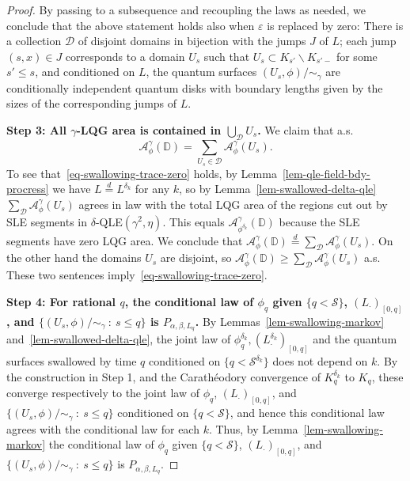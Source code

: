 \documentclass[a4paper]{article}
\numberwithin{equation}{section}
\def\eps{\varepsilon}
\newcommand{\eqb}{\begin{equation}}
\newcommand{\eqe}{\end{equation}}
\newcommand{\D}{\mathbb{D}}
\newcommand{\cA}{\mathcal{A}}
\newcommand{\cD}{\mathcal{D}}
\newcommand{\qduration}{\mathcal{S}}
\theoremstyle{remark}
\numberwithin{equation}{section}
\begin{document}
\begin{proof}
By passing to a subsequence and recoupling the laws as needed, we conclude that the above statement holds also when $\eps$ is replaced by zero: There is a collection $\cD$ of disjoint domains in bijection with the jumps $J$ of $L$; each jump $(s, x) \in J$ corresponds to a domain $U_s$ such that $U_s \subset K_{s'} \backslash K_{s'-}$ for some $s' \leq s$, and conditioned on $L$, the quantum surfaces $(U_s, \phi)/{\sim_\gamma}$ are conditionally independent quantum disks with boundary lengths given by the sizes of the corresponding jumps of $L$.



\medskip \noindent \textbf{Step 3: All $\gamma$-LQG area is contained in $\bigcup_{\cD} U_s$.} We claim that 
a.s.
\eqb\label{eq-swallowing-trace-zero}
\cA^\gamma_\phi(\D) = \sum_{U_s \in \cD} \cA^\gamma_\phi(U_s).
\eqe
To see that~\eqref{eq-swallowing-trace-zero} holds, by Lemma~\ref{lem-qle-field-bdy-procress} we have $L \stackrel d= L^{\delta_k}$ for any $k$, so by Lemma~\ref{lem-swallowed-delta-qle} $\sum_{\mathcal D} \cA^\gamma_\phi(U_s)$ agrees in law with the total LQG area of the regions cut out by SLE segments in $\delta$-QLE$(\gamma^2, \eta)$. This equals $\cA^\gamma_{\phi^{\delta_k}}(\D)$ because the SLE segments have zero LQG area. We conclude that $\cA^\gamma_\phi(\D) \stackrel d= \sum_{\mathcal D} \cA^\gamma_\phi(U_s)$. On the other hand %
the domains $U_s$ are disjoint, so $\cA^\gamma_\phi(\D) \geq \sum_{\mathcal D} \cA^\gamma_\phi(U_s)$ a.s. These two sentences imply~\eqref{eq-swallowing-trace-zero}. 

\medskip \noindent
\textbf{Step 4: For rational $q$, the conditional law of $\phi_{q}$ given $\{q < \qduration\}$, $(L_\cdot)_{[0,q]}$, and $\{(U_s, \phi)/{\sim_\gamma} \: : \: s \leq q\}$ is $P_{\alpha, \beta, L_q}$.} By Lemmas~\ref{lem-swallowing-markov} and~\ref{lem-swallowed-delta-qle}, the joint law of $\phi_{q}^{\delta_k}, (L^{\delta_k}_\cdot)_{[0,q]}$ and the quantum surfaces swallowed by time $q$ conditioned on $\{q < \qduration^{\delta_k}\}$ does not depend on $k$. By the construction in Step 1, and the Carath\'eodory convergence of $K^{\delta_k}_q$ to $K_q$, %
these converge respectively to the joint law of $\phi_q$, $(L_\cdot)_{[0,q]}$, and $\{(U_s, \phi)/{\sim_\gamma} \: : \: s \leq q\}$ conditioned on $\{q < \qduration\}$, and hence this conditional law agrees with the conditional law for each $k$. Thus, by Lemma~\ref{lem-swallowing-markov} the conditional law of $\phi_{q}$ given $\{q < \qduration\}$, $(L_\cdot)_{[0,q]}$, and $\{(U_s, \phi)/{\sim_\gamma} \: : \: s \leq q\}$ is $P_{\alpha, \beta, L_q}$.



\end{proof}
\end{document}
